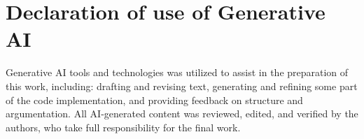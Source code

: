 \section{Declaration of use of Generative AI}

Generative AI tools and technologies was utilized to assist in the preparation of this work, including: drafting and revising text, generating and refining some part of the code implementation, and providing feedback on structure and argumentation.
All AI-generated content was reviewed, edited, and verified by the authors, who take full responsibility for the final work.
